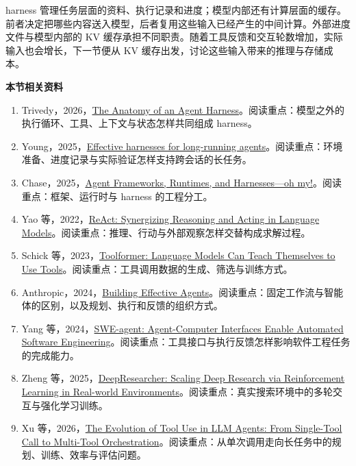 harness 管理任务层面的资料、执行记录和进度；模型内部还有计算层面的缓存。前者决定把哪些内容送入模型，后者复用这些输入已经产生的中间计算。外部进度文件与模型内部的 KV 缓存承担不同职责。随着工具反馈和交互轮数增加，实际输入也会增长，下一节便从 KV 缓存出发，讨论这些输入带来的推理与存储成本。

\textbf{本节相关资料}
\begin{enumerate}
    \item Trivedy，2026，\href{https://www.langchain.com/blog/the-anatomy-of-an-agent-harness}{The Anatomy of an Agent Harness}。阅读重点：模型之外的执行循环、工具、上下文与状态怎样共同组成 harness。
    \item Young，2025，\href{https://www.anthropic.com/research/effective-harnesses-for-long-running-agents}{Effective harnesses for long-running agents}。阅读重点：环境准备、进度记录与实际验证怎样支持跨会话的长任务。
    \item Chase，2025，\href{https://www.langchain.com/blog/agent-frameworks-runtimes-and-harnesses-oh-my}{Agent Frameworks, Runtimes, and Harnesses---oh my!}。阅读重点：框架、运行时与 harness 的工程分工。
    \item Yao 等，2022，\href{https://arxiv.org/abs/2210.03629}{ReAct: Synergizing Reasoning and Acting in Language Models}。阅读重点：推理、行动与外部观察怎样交替构成求解过程。
    \item Schick 等，2023，\href{https://arxiv.org/abs/2302.04761}{Toolformer: Language Models Can Teach Themselves to Use Tools}。阅读重点：工具调用数据的生成、筛选与训练方式。
    \item Anthropic，2024，\href{https://www.anthropic.com/research/building-effective-agents}{Building Effective Agents}。阅读重点：固定工作流与智能体的区别，以及规划、执行和反馈的组织方式。
    \item Yang 等，2024，\href{https://arxiv.org/abs/2405.15793}{SWE-agent: Agent-Computer Interfaces Enable Automated Software Engineering}。阅读重点：工具接口与执行反馈怎样影响软件工程任务的完成能力。
    \item Zheng 等，2025，\href{https://arxiv.org/abs/2504.03160}{DeepResearcher: Scaling Deep Research via Reinforcement Learning in Real-world Environments}。阅读重点：真实搜索环境中的多轮交互与强化学习训练。
    \item Xu 等，2026，\href{https://arxiv.org/abs/2603.22862}{The Evolution of Tool Use in LLM Agents: From Single-Tool Call to Multi-Tool Orchestration}。阅读重点：从单次调用走向长任务中的规划、训练、效率与评估问题。
\end{enumerate}

